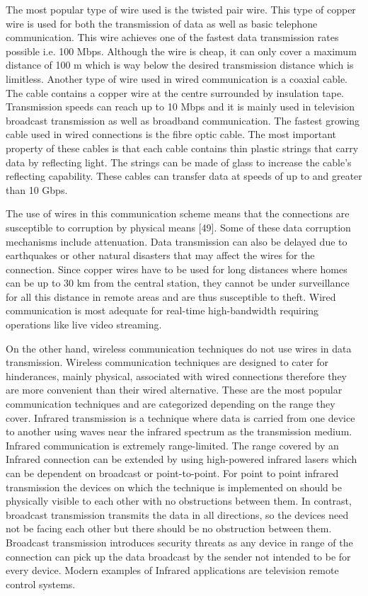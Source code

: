 The most popular type of wire used is the twisted pair wire. This type of copper wire is used for both the transmission of data as well as basic telephone communication. This wire achieves one of the fastest data transmission rates possible i.e. 100 Mbps. Although the wire is cheap, it can only cover a maximum distance of 100 m which is way below the desired transmission distance which is limitless. Another type of wire used in wired communication is a coaxial cable. The cable contains a copper wire at the centre surrounded by insulation tape. Transmission speeds can reach up to 10 Mbps and it is mainly used in television broadcast transmission as well as broadband communication. The fastest growing cable used in wired connections is the fibre optic cable. The most important property of these cables is that each cable contains thin plastic strings that carry data by reflecting light. The strings can be made of glass to increase the cable’s reflecting capability. These cables can transfer data at speeds of up to and greater than 10 Gbps.

The use of wires in this communication scheme means that the connections are susceptible to corruption by physical means [49]. Some of these data corruption mechanisms include attenuation. Data transmission can also be delayed due to earthquakes or other natural disasters that may affect the wires for the connection. Since copper wires have to be used for long distances where homes can be up to 30 km from the central station, they cannot be under surveillance for all this distance in remote areas and are thus susceptible to theft. Wired communication is most adequate for real-time high-bandwidth requiring operations like live video streaming.

On the other hand, wireless communication techniques do not use wires in data transmission. Wireless communication techniques are designed to cater for hinderances, mainly physical, associated with wired connections therefore they are more convenient than their wired alternative. These are the most popular communication techniques and are categorized depending on the range they cover. Infrared transmission is a technique where data is carried from one device to another using waves near the infrared spectrum as the transmission medium. Infrared communication is extremely range-limited.  The range covered by an Infrared connection can be extended by using high-powered infrared lasers which can be dependent on broadcast or point-to-point. For point to point infrared transmission the devices on which the technique is implemented on should be physically visible to each other with no obstructions between them. In contrast, broadcast transmission transmits the data in all directions, so the devices need not be facing each other but there should be no obstruction between them. Broadcast transmission introduces security threats as any device in range of the connection can pick up the data broadcast by the sender not intended to be for every device. Modern examples of Infrared applications are television remote control systems. 

